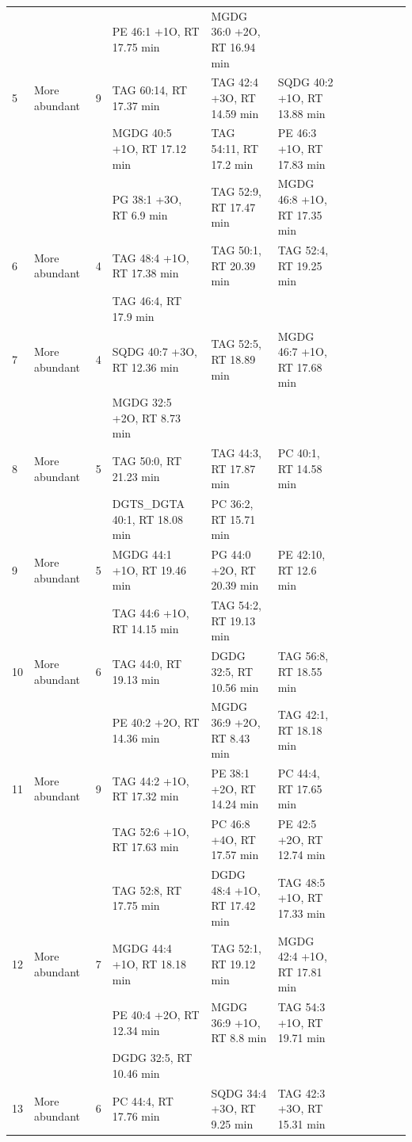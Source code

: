 \begin{landscape}
\begin{footnotesize}
\begin{singlespace}
\begin{flushleft}
\begin{longtable}{ Lp{.03\linewidth} Lp{.12\linewidth} Lp{.03\linewidth} Lp{.24\linewidth} Lp{.24\linewidth} Lp{.24\linewidth} }
 &  &  & PE 46:1 +1O, RT 17.75 min & MGDG 36:0 +2O, RT 16.94 min &  \\
5 & More abundant & 9 & TAG 60:14, RT 17.37 min & TAG 42:4 +3O, RT 14.59 min & SQDG 40:2 +1O, RT 13.88 min \\
 &  &  & MGDG 40:5 +1O, RT 17.12 min & TAG 54:11, RT 17.2 min & PE 46:3 +1O, RT 17.83 min \\
 &  &  & PG 38:1 +3O, RT 6.9 min & TAG 52:9, RT 17.47 min & MGDG 46:8 +1O, RT 17.35 min \\
6 & More abundant & 4 & TAG 48:4 +1O, RT 17.38 min & TAG 50:1, RT 20.39 min & TAG 52:4, RT 19.25 min \\
 &  &  & TAG 46:4, RT 17.9 min &  &  \\
7 & More abundant & 4 & SQDG 40:7 +3O, RT 12.36 min & TAG 52:5, RT 18.89 min & MGDG 46:7 +1O, RT 17.68 min \\
 &  &  & MGDG 32:5 +2O, RT 8.73 min &  &  \\
8 & More abundant & 5 & TAG 50:0, RT 21.23 min & TAG 44:3, RT 17.87 min & PC 40:1, RT 14.58 min \\
 &  &  & DGTS\_DGTA 40:1, RT 18.08 min & PC 36:2, RT 15.71 min &  \\
9 & More abundant & 5 & MGDG 44:1 +1O, RT 19.46 min & PG 44:0 +2O, RT 20.39 min & PE 42:10, RT 12.6 min \\
 &  &  & TAG 44:6 +1O, RT 14.15 min & TAG 54:2, RT 19.13 min &  \\
10 & More abundant & 6 & TAG 44:0, RT 19.13 min & DGDG 32:5, RT 10.56 min & TAG 56:8, RT 18.55 min \\
 &  &  & PE 40:2 +2O, RT 14.36 min & MGDG 36:9 +2O, RT 8.43 min & TAG 42:1, RT 18.18 min \\
11 & More abundant & 9 & TAG 44:2 +1O, RT 17.32 min & PE 38:1 +2O, RT 14.24 min & PC 44:4, RT 17.65 min \\
 &  &  & TAG 52:6 +1O, RT 17.63 min & PC 46:8 +4O, RT 17.57 min & PE 42:5 +2O, RT 12.74 min \\
 &  &  & TAG 52:8, RT 17.75 min & DGDG 48:4 +1O, RT 17.42 min & TAG 48:5 +1O, RT 17.33 min \\
12 & More abundant & 7 & MGDG 44:4 +1O, RT 18.18 min & TAG 52:1, RT 19.12 min & MGDG 42:4 +1O, RT 17.81 min \\
 &  &  & PE 40:4 +2O, RT 12.34 min & MGDG 36:9 +1O, RT 8.8 min & TAG 54:3 +1O, RT 19.71 min \\
 &  &  & DGDG 32:5, RT 10.46 min &  &  \\
13 & More abundant & 6 & PC 44:4, RT 17.76 min & SQDG 34:4 +3O, RT 9.25 min & TAG 42:3 +3O, RT 15.31 min \\

\end{longtable}
\end{flushleft}
\end{singlespace}
\end{footnotesize}
\end{landscape}

